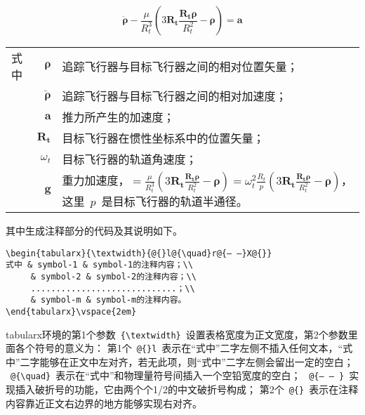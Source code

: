 \begin{equation}\label{eq:1}
  \ddot{\boldsymbol{\rho}}-\frac{\mu}{R_{t}^{3}}\left(3\mathbf{R_{t}}\frac{\mathbf{R_{t}\rho}}{R_{t}^{2}}-\boldsymbol{\rho}\right)=\mathbf{a}
\end{equation}
\begin{tabularx}{\textwidth}{@{}l@{\quad}r@{——}X@{}}
  式中 & $\boldsymbol{\rho}$        & 追踪飞行器与目标飞行器之间的相对位置矢量； \\
       & $\boldsymbol{\ddot{\rho}}$ & 追踪飞行器与目标飞行器之间的相对加速度；   \\
       & $\mathbf{a}$               & 推力所产生的加速度；                       \\
       & $\mathbf{R_t}$             & 目标飞行器在惯性坐标系中的位置矢量；       \\
       & $\omega_{t}$               & 目标飞行器的轨道角速度；                   \\
       & $\mathbf{g}$               & 重力加速度，$=\frac{\mu}{R_{t}^{3}}\left(
    3\mathbf{R_{t}}\frac{\mathbf{R_{t}\rho}}{R_{t}^{2}}-\boldsymbol{\rho}\right)=\omega_{t}^{2}\frac{R_{t}}{p}\left(
    3\mathbf{R_{t}}\frac{\mathbf{R_{t}\rho}}{R_{t}^{2}}-\boldsymbol{\rho}\right)$，这里~$p$~是目标飞行器的轨道半通径。
\end{tabularx}
\vspace{2em}

其中生成注释部分的代码及其说明如下。
\vspace{1em}
\begin{lstlisting}
\begin{tabularx}{\textwidth}{@{}l@{\quad}r@{— —}X@{}}
式中 & symbol-1 & symbol-1的注释内容；\\
     & symbol-2 & symbol-2的注释内容；\\
     .............................；\\
     & symbol-m & symbol-m的注释内容。
\end{tabularx}\vspace{2em}
\end{lstlisting}


tabularx环境的第1个参数~\verb|{\textwidth}|~设置表格宽度为正文宽度，第2个参数里面各个符号的意义为：
第1个~\verb|@{}l|~表示在“式中”二字左侧不插入任何文本，“式中”二字能够在正文中左对齐，若无此项，则“式中”二字左侧会留出一定的空白；
~\verb|@{\quad}|~表示在“式中”和物理量符号间插入一个空铅宽度的空白；
~\verb|@{— — }|~实现插入破折号的功能，它由两个个1/2的中文破折号构成；
第2个~\verb|@{}|~表示在注释内容靠近正文右边界的地方能够实现右对齐。


